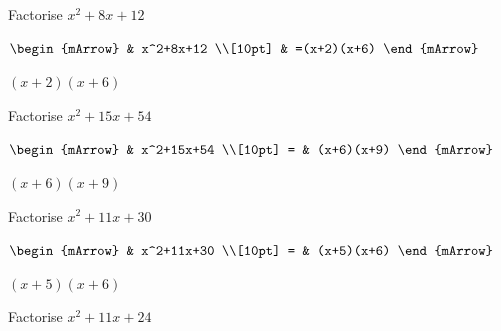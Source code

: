 \begin{mtask}[resume]
   \task \begin{exercise} Factorise $x^2+8x+12$\\
             \begin{envSolution}
			      $\begin{mArrow}
			         & x^2+8x+12                       \\[10pt]    
					 & =(x+2)(x+6)
				 \end{mArrow}$
                 \begin{shortsolution}  
				       $(x+2)(x+6)$
			     \end{shortsolution}				 
               \end{envSolution}
         \end{exercise}

   \task \begin{exercise} Factorise $x^2+15x+54$\\
             \begin{envSolution}
			      $\begin{mArrow}
			         & x^2+15x+54                       \\[10pt]  
                   = & (x+6)(x+9)					
				 \end{mArrow}$
                 \begin{shortsolution}  
				       $(x+6)(x+9)$
			     \end{shortsolution}				 
               \end{envSolution}
         \end{exercise}

   \task \begin{exercise} Factorise $x^2+11x+30$\\
             \begin{envSolution}
			      
			      $\begin{mArrow}
			         & x^2+11x+30                       \\[10pt]    
					 = & (x+5)(x+6)
				 \end{mArrow}$
                 \begin{shortsolution}  
				       $(x+5)(x+6)$
			     \end{shortsolution}				 
               \end{envSolution}
         \end{exercise}

   \task \begin{exercise} Factorise $x^2+11x+24$\\
             \begin{envSolution}
			      

\end{envSolution}
\end{exercise}
\end{mtask}
